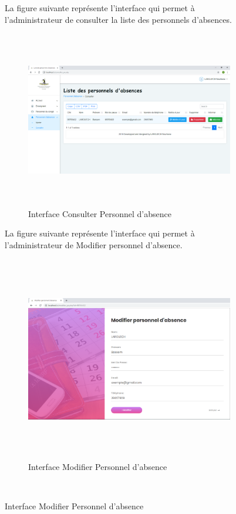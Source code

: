 \documentclass[12 pt]{report}
\begin{document}
\begin{figure}[h]
\begin{center}
La figure suivante représente l'interface qui permet à l'administrateur de consulter la liste des personnels d'absences.
\begin{figure}[h]
 \begin{center}
\includegraphics[width= 18 cm ,height=  7.75cm]{consulter_pa.PNG}
\caption{Interface Consulter Personnel d'absence}

\end{center}
\end{figure}
\newpage
La figure suivante représente l'interface qui permet à l'administrateur de Modifier  personnel d'absence.
\begin{figure}[h]
 \begin{center}
\includegraphics[width= 18 cm ,height=  9cm]{modifier_pa.PNG}
\caption{Interface Modifier Personnel d'absence}

\end{center}
\end{figure}\\


\end{center}
\end{figure}
\end{document}
